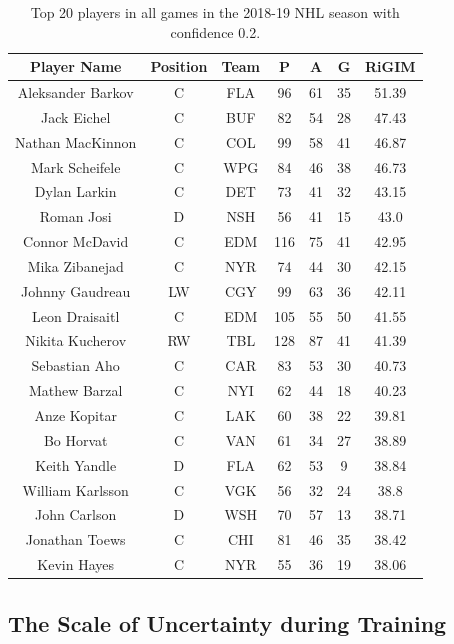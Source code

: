 \documentclass{article}
\newcommand{\sys}{RiGIM}
\begin{document}
\begin{table}[htbp]
\centering
\caption{Top 20 players in all games in the 2018-19 NHL season with confidence 0.2.}
\label{table:player-ranking-all-0.2}
\begin{tabular}{ccccccc}
\toprule
Player Name  & Position & Team  & P & A & G & \sys \\ \hline
Aleksander Barkov & C & FLA & 96 & 61 & 35 & 51.39\\ 
Jack Eichel & C & BUF & 82 & 54 & 28 & 47.43\\ 
Nathan MacKinnon & C & COL & 99 & 58 & 41 & 46.87\\ 
Mark Scheifele & C & WPG & 84 & 46 & 38 & 46.73\\ 
Dylan Larkin & C & DET & 73 & 41 & 32 & 43.15\\ 
Roman Josi & D & NSH & 56 & 41 & 15 & 43.0\\ 
Connor McDavid & C & EDM & 116 & 75 & 41 & 42.95\\ 
Mika Zibanejad & C & NYR & 74 & 44 & 30 & 42.15\\ 
Johnny Gaudreau & LW & CGY & 99 & 63 & 36 & 42.11\\ 
Leon Draisaitl & C & EDM & 105 & 55 & 50 & 41.55\\ 
Nikita Kucherov & RW & TBL & 128 & 87 & 41 & 41.39\\ 
Sebastian Aho & C & CAR & 83 & 53 & 30 & 40.73\\ 
Mathew Barzal & C & NYI & 62 & 44 & 18 & 40.23\\ 
Anze Kopitar & C & LAK & 60 & 38 & 22 & 39.81\\ 
Bo Horvat & C & VAN & 61 & 34 & 27 & 38.89\\ 
Keith Yandle & D & FLA & 62 & 53 & 9 & 38.84\\ 
William Karlsson & C & VGK & 56 & 32 & 24 & 38.8\\ 
John Carlson & D & WSH & 70 & 57 & 13 & 38.71\\ 
Jonathan Toews & C & CHI & 81 & 46 & 35 & 38.42\\ 
Kevin Hayes & C & NYR & 55 & 36 & 19 & 38.06\\ 
\bottomrule
\end{tabular}
\end{table}

\subsection{The Scale of Uncertainty during Training}
\end{document}
